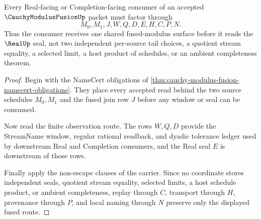 \begin{theorem}
\label{thm:cauchy-modulus-fusion-real-completion-route}
Every Real-facing or Completion-facing consumer of an accepted $\CauchyModulusFusionUp$ packet must factor through
$$
M_0,M_1,J,W,Q,D,E,H,C,P,N.
$$
Thus the consumer receives one shared fused-modulus surface before it reads the $\RealUp$ seal, not two independent per-source tail choices, a quotient stream equality, a selected limit, a host product of schedules, or an ambient completeness theorem.
\end{theorem}
\begin{proof}
Begin with the NameCert obligations of \autoref{thm:cauchy-modulus-fusion-namecert-obligations}. They place every accepted read behind the two source schedules $M_0,M_1$ and the fused join row $J$ before any window or seal can be consumed.

Now read the finite observation route. The rows $W,Q,D$ provide the StreamName window, regular rational readback, and dyadic tolerance ledger used by downstream Real and Completion consumers, and the Real seal $E$ is downstream of those rows.

Finally apply the non-escape clauses of the carrier. Since no coordinate stores independent seals, quotient stream equality, selected limits, a host schedule product, or ambient completeness, replay through $C$, transport through $H$, provenance through $P$, and local naming through $N$ preserve only the displayed fused route.
\end{proof}




